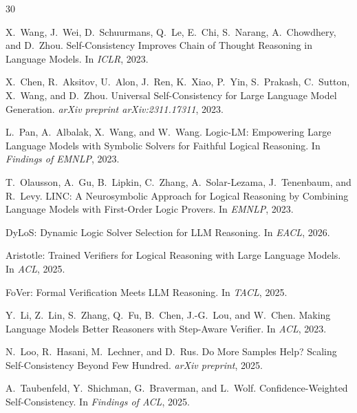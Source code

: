 \documentclass[11pt,a4paper]{article}
\begin{document}


\begin{thebibliography}{30}

X.~Wang, J.~Wei, D.~Schuurmans, Q.~Le, E.~Chi, S.~Narang, A.~Chowdhery, and D.~Zhou.
\newblock Self-Consistency Improves Chain of Thought Reasoning in Language Models.
\newblock In \emph{ICLR}, 2023.

X.~Chen, R.~Aksitov, U.~Alon, J.~Ren, K.~Xiao, P.~Yin, S.~Prakash, C.~Sutton, X.~Wang, and D.~Zhou.
\newblock Universal Self-Consistency for Large Language Model Generation.
\newblock \emph{arXiv preprint arXiv:2311.17311}, 2023.

L.~Pan, A.~Albalak, X.~Wang, and W.~Wang.
\newblock Logic-LM: Empowering Large Language Models with Symbolic Solvers for Faithful Logical Reasoning.
\newblock In \emph{Findings of EMNLP}, 2023.

T.~Olausson, A.~Gu, B.~Lipkin, C.~Zhang, A.~Solar-Lezama, J.~Tenenbaum, and R.~Levy.
\newblock LINC: A Neurosymbolic Approach for Logical Reasoning by Combining Language Models with First-Order Logic Provers.
\newblock In \emph{EMNLP}, 2023.

DyLoS: Dynamic Logic Solver Selection for LLM Reasoning.
\newblock In \emph{EACL}, 2026.

Aristotle: Trained Verifiers for Logical Reasoning with Large Language Models.
\newblock In \emph{ACL}, 2025.

FoVer: Formal Verification Meets LLM Reasoning.
\newblock In \emph{TACL}, 2025.

Y.~Li, Z.~Lin, S.~Zhang, Q.~Fu, B.~Chen, J.-G.~Lou, and W.~Chen.
\newblock Making Language Models Better Reasoners with Step-Aware Verifier.
\newblock In \emph{ACL}, 2023.

N.~Loo, R.~Hasani, M.~Lechner, and D.~Rus.
\newblock Do More Samples Help? Scaling Self-Consistency Beyond Few Hundred.
\newblock \emph{arXiv preprint}, 2025.

A.~Taubenfeld, Y.~Shichman, G.~Braverman, and L.~Wolf.
\newblock Confidence-Weighted Self-Consistency.
\newblock In \emph{Findings of ACL}, 2025.


\end{thebibliography}
\end{document}
